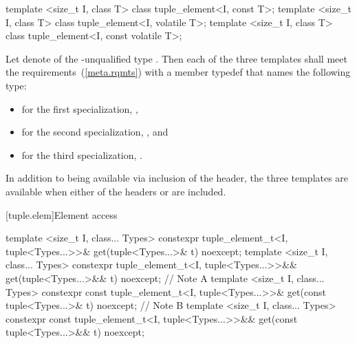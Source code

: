 %
\begin{itemdecl}
template <size_t I, class T> class tuple_element<I, const T>;
template <size_t I, class T> class tuple_element<I, volatile T>;
template <size_t I, class T> class tuple_element<I, const volatile T>;
\end{itemdecl}

\begin{itemdescr}
\pnum
Let  denote  of the \cv-unqualified type . Then
each of the three templates shall meet the 
requirements~(\ref{meta.rqmts}) with a member typedef  that names the following
type:

\begin{itemize}
\item
for the first specialization, ,
\item
for the second specialization, , and
\item
for the third specialization, .
\end{itemize}

\pnum
In addition to being available via inclusion of the  header,
the three templates are available when either of the headers  or
 are included.
\end{itemdescr}

[tuple.elem]{Element access}

%
\begin{itemdecl}
template <size_t I, class... Types>
  constexpr tuple_element_t<I, tuple<Types...>>&
    get(tuple<Types...>& t) noexcept;
template <size_t I, class... Types>
  constexpr tuple_element_t<I, tuple<Types...>>&&
    get(tuple<Types...>&& t) noexcept;        // Note A
template <size_t I, class... Types>
  constexpr const tuple_element_t<I, tuple<Types...>>&
    get(const tuple<Types...>& t) noexcept;   // Note B
template <size_t I, class... Types>
  constexpr const tuple_element_t<I, tuple<Types...>>&& get(const tuple<Types...>&& t) noexcept;
\end{itemdecl}

